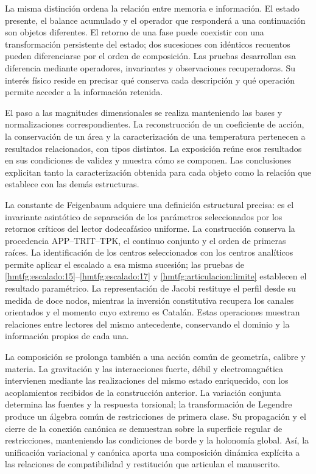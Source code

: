 La misma distinción ordena la relación entre memoria e información. El
estado presente, el balance acumulado y el operador que responderá a una
continuación son objetos diferentes. El retorno de una fase puede coexistir
con una transformación persistente del estado; dos sucesiones con idénticos
recuentos pueden diferenciarse por el orden de composición. Las pruebas
desarrollan esa diferencia mediante operadores, invariantes y observaciones
recuperadoras. Su interés físico reside en precisar qué conserva cada
descripción y qué operación permite acceder a la información retenida.

El paso a las magnitudes dimensionales se realiza manteniendo las bases y
normalizaciones correspondientes. La reconstrucción de un coeficiente de
acción, la conservación de un área y la caracterización de una temperatura
pertenecen a resultados relacionados, con tipos distintos. La exposición
reúne esos resultados en sus condiciones de validez y muestra cómo se
componen. Las conclusiones explicitan tanto la caracterización obtenida
para cada objeto como la relación que establece con las demás estructuras.

La constante de Feigenbaum adquiere una definición estructural precisa: es el invariante asintótico de separación de los parámetros seleccionados por los retornos críticos del lector dodecafásico uniforme. La construcción conserva la procedencia APP--TRIT--TPK, el continuo conjunto y el orden de primeras raíces. La identificación de los centros seleccionados con los centros analíticos permite aplicar el escalado a esa misma sucesión; las pruebas de \ref{hmtfg:escalado:15}--\ref{hmtfg:escalado:17} y \eqref{hmtfg:articulacion:limite} establecen el resultado paramétrico. La representación de Jacobi restituye el perfil desde su medida de doce nodos, mientras la inversión constitutiva recupera los canales orientados y el momento cuyo extremo es Catalán. Estas operaciones muestran relaciones entre lectores del mismo antecedente, conservando el dominio y la información propios de cada una.

La composición se prolonga también a una acción común de geometría, calibre y materia. La gravitación y las interacciones fuerte, débil y electromagnética intervienen mediante las realizaciones del mismo estado enriquecido, con los acoplamientos recibidos de la construcción anterior. La variación conjunta determina las fuentes y la respuesta torsional; la transformación de Legendre produce un álgebra común de restricciones de primera clase. Su propagación y el cierre de la conexión canónica se demuestran sobre la superficie regular de restricciones, manteniendo las condiciones de borde y la holonomía global. Así, la unificación variacional y canónica aporta una composición dinámica explícita a las relaciones de compatibilidad y restitución que articulan el manuscrito.
